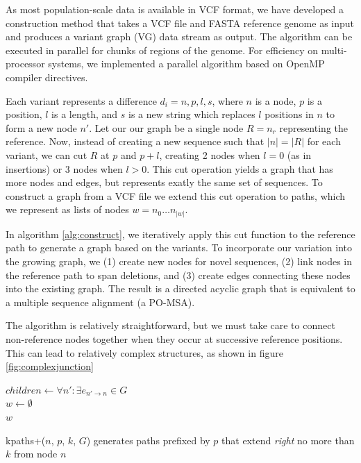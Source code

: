 \documentclass{article}
\begin{document}
As most population-scale data is available in VCF format, we have developed a construction method that takes a VCF file and FASTA reference genome as input and produces a variant graph (VG) data stream as output.
The algorithm can be executed in parallel for chunks of regions of the genome. For efficiency on multi-processor systems, we implemented a parallel algorithm based on OpenMP compiler directives.

Each variant represents a difference $d_i = { n, p, l, s }$, where $n$ is a node, $p$ is a position, $l$ is a length, and $s$ is a new string which replaces $l$ positions in $n$ to form a new node $n'$.
Let our our graph be a single node $R = n_r$ representing the reference.
Now, instead of creating a new sequence such that $|n| = |R|$ for each variant, we can cut $R$ at $p$ and $p+l$, creating 2 nodes when $l = 0$ (as in insertions) or 3 nodes when $l > 0$.
This cut operation yields a graph that has more nodes and edges, but represents exatly the same set of sequences.
To construct a graph from a VCF file we extend this cut operation to paths, which we represent as lists of nodes $w = n_0 \ldots n_{|w|}$.

In algorithm \ref{alg:construct}, we iteratively apply this cut function to the reference path to generate a graph based on the variants. To incorporate our variation into the growing graph, we (1) create new nodes for novel sequences, (2) link nodes in the reference path to span deletions, and (3) create edges connecting these nodes into the existing graph. The result is a directed acyclic graph that is equivalent to a multiple sequence alignment (a PO-MSA).

The algorithm is relatively straightforward, but we must take care to connect non-reference nodes together when they occur at successive reference positions. This can lead to relatively complex structures, as shown in figure \ref{fig:complexjunction}


\begin{function}[h!]
  \label{func:kpaths+}
  $children \gets \forall n' : \exists e_{n' \rightarrow n} \in G$ \\
  $w \gets \emptyset$ \\
  \Return $w$
  \caption{kpaths+($n$, $p$, $k$, $G$) generates paths prefixed by $p$ that extend \emph{right} no more than $k$ from node $n$ }
\end{function}
\end{document}
